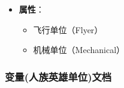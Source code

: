\begin{tcolorbox}[colback=white, colframe=black!60!white, title=Terran\_Science\_Vessel(), arc=0mm]
    \begin{itemize}
        \item \textbf{属性}：
            \begin{itemize}
                \item 飞行单位（Flyer）
                \item 机械单位（Mechanical）
            \end{itemize}
    \end{itemize}
\end{tcolorbox}

\subsubsection{变量(人族英雄单位)文档}

